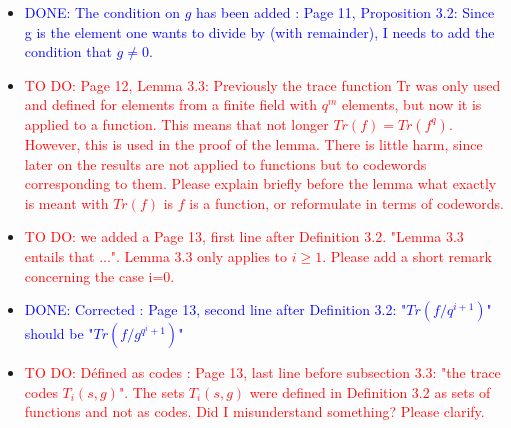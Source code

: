 \documentclass[12pt,a4paper]{amsart}
\newcommand\TODO[1]{\textcolor{red}{TO DO: #1}}
\newcommand\DONE[1]{\textcolor{blue}{DONE: #1}}
\begin{document}
\begin{itemize}
\item \DONE{The condition on $g$ has been added : Page 11, Proposition 3.2: Since g is the element one wants to divide by (with remainder), I needs to add the condition that $g \neq 0$}.

\item \TODO{Page 12, Lemma 3.3: Previously the trace function Tr was only used and defined for elements from a finite field with $q^m$ elements, but now it is applied to a function. This means that not longer $Tr(f)=Tr(f^q)$. However, this is used in the proof of the lemma. There is little harm, since later on the results are not applied to functions but to codewords corresponding to them. Please explain briefly before the lemma what exactly is meant with $Tr(f)$ is $f$ is a function, or reformulate in terms of codewords.}

\item \TODO{we added a Page 13, first line after Definition 3.2. "Lemma 3.3 entails that ...". Lemma 3.3 only applies to $i \ge 1$. Please add a short remark concerning the case i=0.} 

\item \DONE{ Corrected : Page 13, second line after Definition 3.2: "$Tr(f/q^{i+1})$" should be "$Tr(f/g^{q^i+1})$"}

\item \TODO{Défined as codes : Page 13, last line before subsection 3.3: "the trace codes $T_i(s,g)$". The sets $T_i(s,g)$ were defined in Definition 3.2 as sets of functions and not as codes. Did I misunderstand something? Please clarify.}
\end{itemize}
\end{document}
